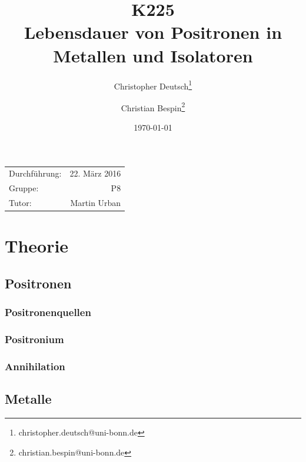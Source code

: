 \documentclass[11pt, a4paper]{article}
\title{K225 \\ Lebensdauer von Positronen in Metallen und Isolatoren}
\author{Christopher Deutsch\footnote{christopher.deutsch@uni-bonn.de} \and Christian Bespin\footnote{christian.bespin@uni-bonn.de}}
\date{\today}
\numberwithin{equation}{section}
\begin{document}
\begin{titlepage}

\maketitle

\begin{center}
\begin{tabular}{l r}
Durchführung: & 22. März 2016 \\
Gruppe: & P8 \\
Tutor: & Martin Urban
\end{tabular}
\end{center}

\begin{abstract}
\noindent 
\end{abstract}

\end{titlepage}

\tableofcontents
\newpage

\section{Theorie}

\subsection{Positronen}

\subsubsection{Positronenquellen}

\subsubsection{Positronium}

\subsubsection{Annihilation}

\subsection{Metalle}
\end{document}

